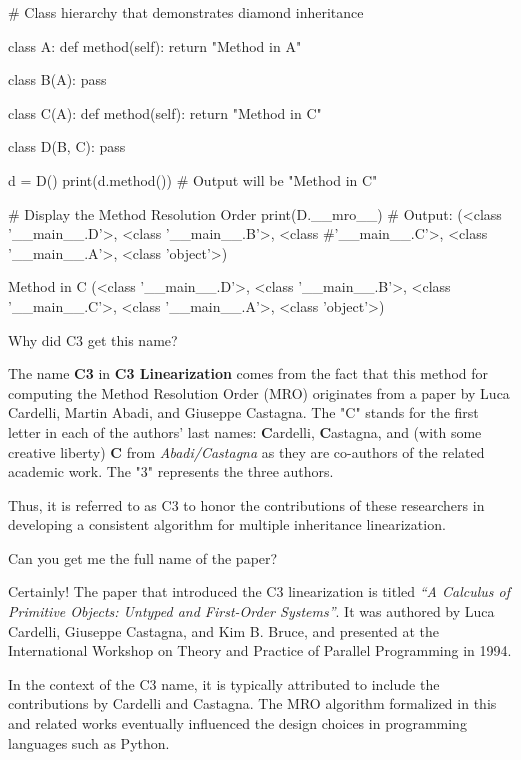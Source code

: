 \begin{python}
# Class hierarchy that demonstrates diamond inheritance

class A:
  def method(self):
    return "Method in A"

class B(A):
  pass

class C(A):
  def method(self):
    return "Method in C"

class D(B, C):
  pass

d = D()
print(d.method())  # Output will be "Method in C"

# Display the Method Resolution Order
print(D.__mro__)  # Output: (<class '__main__.D'>, <class '__main__.B'>, <class
#'__main__.C'>, <class '__main__.A'>, <class 'object'>)
\end{python}

\begin{result}
Method in C
(<class '__main__.D'>, <class '__main__.B'>, <class '__main__.C'>, <class
'__main__.A'>, <class 'object'>)
\end{result}



\begin{ai}
Why did C3 get this name?
\end{ai}

\begin{airesult}
The name \textbf{C3} in \textbf{C3 Linearization} comes from the fact that this
method for computing the Method Resolution Order (MRO) originates from a paper
by Luca Cardelli, Martin Abadi, and Giuseppe Castagna. The "C" stands for the
first letter in each of the authors' last names: \textbf{C}ardelli,
\textbf{C}astagna, and (with some creative liberty) \textbf{C} from
\textit{Abadi/Castagna} as they are co-authors of the related academic work. The
"3" represents the three authors.

Thus, it is referred to as C3 to honor the contributions of these researchers in
developing a consistent algorithm for multiple inheritance linearization.
\end{airesult}

\begin{ai}
Can you get me the full name of the paper?
\end{ai}

\begin{airesult}
Certainly! The paper that introduced the C3 linearization is titled \textit{“A
Calculus of Primitive Objects: Untyped and First-Order Systems”}. It was
authored by Luca Cardelli, Giuseppe Castagna, and Kim B. Bruce, and presented at
the International Workshop on Theory and Practice of Parallel Programming in
1994.

In the context of the C3 name, it is typically attributed to include the
contributions by Cardelli and Castagna. The MRO algorithm formalized in this and
related works eventually influenced the design choices in programming languages
such as Python.
\end{airesult}

